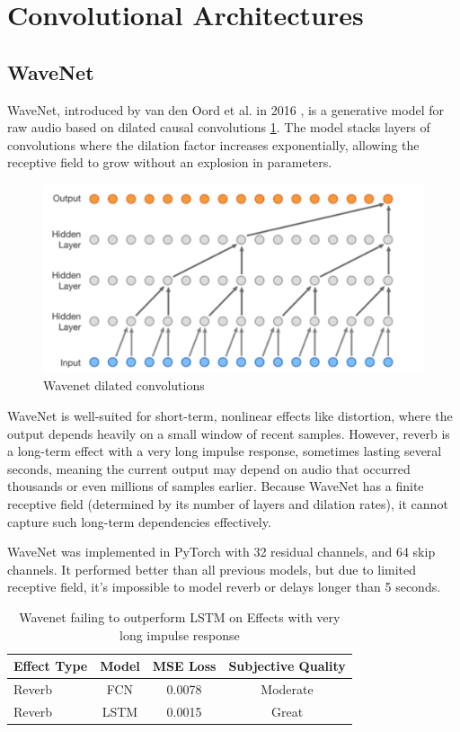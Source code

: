 \documentclass[masterthesis]{fer}
\begin{document}
\section {Convolutional Architectures}

\subsection{WaveNet}

WaveNet, introduced by van den Oord et al. in 2016 \cite{oord2016wavenetgenerativemodelraw}, is a generative model for raw audio based on dilated causal convolutions \ref{fig:wavenet}. The model stacks layers of convolutions where the dilation factor increases exponentially, allowing the receptive field to grow without an explosion in parameters.

\begin{figure}[htb]
  \centering
  \includegraphics[width=0.6\linewidth]{Figures/wavenet_conv.png} 
  \caption{Wavenet dilated convolutions}
  \label{fig:wavenet}
\end{figure}


WaveNet is well-suited for short-term, nonlinear effects like distortion, where the output depends heavily on a small window of recent samples. However, reverb is a long-term effect with a very long impulse response, sometimes lasting several seconds, meaning the current output may depend on audio that occurred thousands or even millions of samples earlier. Because WaveNet has a finite receptive field (determined by its number of layers and dilation rates), it cannot capture such long-term dependencies effectively.

WaveNet was implemented in PyTorch with 32 residual channels, and 64 skip channels. It performed better than all previous models, but due to limited receptive field, it's impossible to model reverb or delays longer than 5 seconds. 

\begin{table}[h]
\centering
\caption{Wavenet failing to outperform LSTM on Effects with very long impulse response}
\label{tab:wavenet_performance}
\begin{tabular}{lccc}
\toprule
\textbf{Effect Type} & \textbf{Model} & \textbf{MSE Loss} & \textbf{Subjective Quality} \\
\midrule
Reverb & FCN     & 0.0078 & Moderate \\
Reverb & LSTM    & 0.0015 & Great \\
\bottomrule
\end{tabular}
\end{table}
\end{document}
